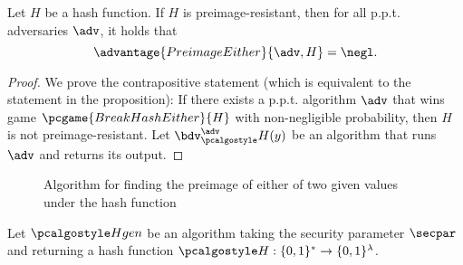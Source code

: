 \begin{proposition}
  Let $H$ be a hash function. If $H$ is preimage-resistant, then for all p.p.t. adversaries $\adv$, it holds that
  \[
  \advantage{PreimageEither}{\adv, H} = \negl.
  \]
\end{proposition}
\begin{proof}
  We prove the contrapositive statement (which is equivalent to the statement in the proposition):
  If there exists a p.p.t. algorithm $\adv$ that wins game $\pcgame{BreakHashEither}{H}$ with non-negligible probability, then $H$ is not preimage-resistant.
  Let $\bdv^\adv_\algo{H}(y)$ be an algorithm that runs $\adv$ and returns its output.
\end{proof}
\begin{figure}[tbhp]
  \begin{center}
    \begin{tcolorbox}[width=5cm]
      \begin{pchstack}[center]
      \end{pchstack}
    \end{tcolorbox}
  \end{center}
  \caption{Algorithm for finding the preimage of either of two given values under the hash function \label{fig:break-hash-either-bdv}}
  \end{figure}




Let $\algo{Hgen}$ be an algorithm taking the security parameter $\secpar$ and returning a hash function $\algo{H}: \{0, 1\}^* \rightarrow \{0, 1\}^\lambda$.


